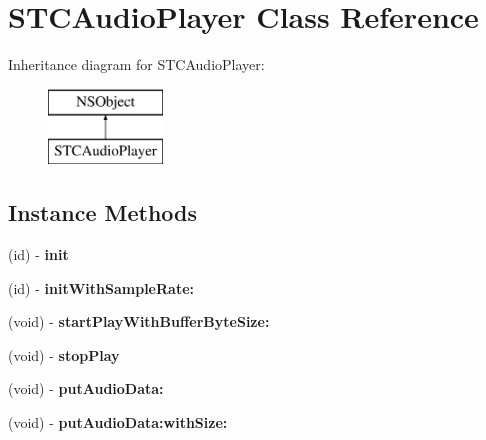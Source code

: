 \hypertarget{interface_s_t_c_audio_player}{}\section{S\+T\+C\+Audio\+Player Class Reference}
\label{interface_s_t_c_audio_player}
Inheritance diagram for S\+T\+C\+Audio\+Player\+:\begin{figure}[H]
\begin{center}
\leavevmode
\includegraphics[height=2.000000cm]{interface_s_t_c_audio_player}
\end{center}
\end{figure}
\subsection*{Instance Methods}
\begin{DoxyCompactItemize}
\item 
\hypertarget{interface_s_t_c_audio_player_ad17114a67589aa0826ddf8e75c867698}{}\label{interface_s_t_c_audio_player_ad17114a67589aa0826ddf8e75c867698} 
(id) -\/ {\bfseries init}
\item 
\hypertarget{interface_s_t_c_audio_player_afe794dfabbc6a290078178cdb68f10b6}{}\label{interface_s_t_c_audio_player_afe794dfabbc6a290078178cdb68f10b6} 
(id) -\/ {\bfseries init\+With\+Sample\+Rate\+:}
\item 
\hypertarget{interface_s_t_c_audio_player_a0abca23d0250d4d82a47dbf83146aa6a}{}\label{interface_s_t_c_audio_player_a0abca23d0250d4d82a47dbf83146aa6a} 
(void) -\/ {\bfseries start\+Play\+With\+Buffer\+Byte\+Size\+:}
\item 
\hypertarget{interface_s_t_c_audio_player_addcde4753a5af3f4fef932473a2fa010}{}\label{interface_s_t_c_audio_player_addcde4753a5af3f4fef932473a2fa010} 
(void) -\/ {\bfseries stop\+Play}
\item 
\hypertarget{interface_s_t_c_audio_player_a6d9583c2d65fd7cf1f4d637f4868683c}{}\label{interface_s_t_c_audio_player_a6d9583c2d65fd7cf1f4d637f4868683c} 
(void) -\/ {\bfseries put\+Audio\+Data\+:}
\item 
\hypertarget{interface_s_t_c_audio_player_a11c739543195f43073ef628d637b15d4}{}\label{interface_s_t_c_audio_player_a11c739543195f43073ef628d637b15d4} 
(void) -\/ {\bfseries put\+Audio\+Data\+:with\+Size\+:}
\end{DoxyCompactItemize}
